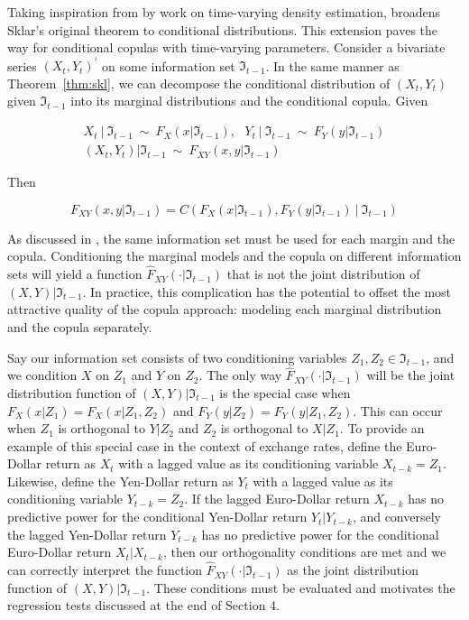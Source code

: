 \documentclass[12pt]{article}
\begin{document}
Taking inspiration from by \cite{Hansen_1994} work on time-varying density estimation, \cite{Patton_2006} broadens Sklar's original theorem to conditional distributions. This extension paves the way for conditional copulas with time-varying parameters. Consider a bivariate series $\left(X_{t},Y_{t}\right)^{\prime}$ on some information set $\Im_{t-1}$. In the same manner as Theorem~\ref{thm:skl}, we can decompose the conditional distribution of $\left(X_{t},Y_{t}\right)$ given $\Im _{t-1}$ into its marginal distributions and the conditional copula. Given 

\begin{gather*}
	X_{t}~|~\Im _{t-1}~\sim~F_{X}\left(x|\Im_{t-1}\right), ~~~ Y_{t}~|~\Im_{t-1}~\sim ~ F_{Y}\left(y|\Im_{t-1}\right) \\ \left(X_{t},Y_{t}\right) | \Im _{t-1}~ \sim ~ F_{XY}\left(x,y|\Im_{t-1}\right) 
\end{gather*}

Then

\begin{equation} \label{eqn:patton}
	F_{XY}\left(x,y| \Im_{t-1}\right) = C\left(F_{X}\left(x| \Im_{t-1}\right)
,F_{Y}\left(y| \Im_{t-1}\right) ~|~ \Im_{t-1}\right)
\end{equation}

As discussed in \cite{Patton_2006}, the same information set must be used for each margin and the copula. Conditioning the marginal models and the copula on different information sets will yield a function $\hat{F}_{XY}\left(\cdot|\Im_{t-1}\right)$ that is not the joint distribution of $\left(X,Y\right)|\Im_{t-1}$. In practice, this complication has the potential to offset the most attractive quality of the copula approach: modeling each marginal distribution and the copula separately.

Say our information set consists of two conditioning variables $Z_{1},Z_{2}\in\Im_{t-1}$, and we condition $X$ on $Z_{1}$ and $Y$ on $Z_{2}$. The only way $\hat{F}_{XY}\left(\cdot|\Im_{t-1}\right)$ will be the joint distribution function of $\left(X,Y\right)|\Im_{t-1}$ is the special case when $F_{X}\left(x|Z_{1}\right) = F_{X}\left(x|Z_{1},Z_{2}\right)$ and $F_{Y}\left(y|Z_{2}\right) = F_{Y}\left(y|Z_{1},Z_{2}\right)$. This can occur when $Z_{1}$ is orthogonal to $Y|Z_{2}$ and $Z_{2}$ is orthogonal to $X|Z_{1}$. To provide an example of this special case in the context of exchange rates, define the Euro-Dollar return as $X_{t}$ with a lagged value as its conditioning variable $X_{t-k} = Z_{1}$. Likewise, define the Yen-Dollar return as $Y_{t}$ with a lagged value as its conditioning variable $Y_{t-k} = Z_{2}$. If the lagged Euro-Dollar return $X_{t-k}$ has no predictive power for the conditional Yen-Dollar return $Y_{t}|Y_{t-k}$, and conversely the lagged Yen-Dollar return $Y_{t-k}$ has no predictive power for the conditional Euro-Dollar return $X_{t}|X_{t-k}$, then our orthogonality conditions are met and we can correctly interpret the function $\hat{F}_{XY}\left(\cdot|\Im_{t-1}\right)$ as the joint distribution function of $\left(X,Y\right)|\Im _{t-1}$. These conditions must be evaluated and motivates the regression tests discussed at the end of Section 4.
\end{document}
